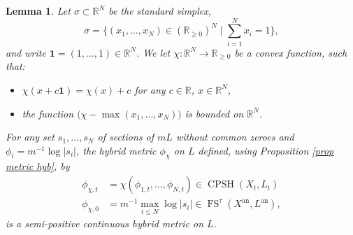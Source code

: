\documentclass[JEP,XML,SOM,Unicode,published]{cedram}
\let\ts\textstyle
\let\sep\mid
\newtheorem{lem}[equation]{Lemma}
\theoremstyle{definition}
\newcommand \R{\mathbb R}
\newcommand{\an}{\mathrm{an}}
\DeclareMathOperator{\CPSH}{CPSH}
\DeclareMathOperator{\FS}{FS}
\begin{document}
\begin{lem} \label{prop homo} Let $\sigma \subset \R^N$ be the standard simplex, \ie
\[
\sigma = \bigl\{ (x_1,\dots,x_N) \in (\R_{\ge 0})^N \sep\ts\sum_{i=1}^N x_i =1 \bigr\},
\]
and write $\mathbf{1} = (1,\dots,1) \in \R^N$. We let $\chi: \R^N \to \R_{\ge 0}$ be a convex function, such that:
\begin{itemize}
\item $\chi(x+c \mathbf{1}) = \chi(x)+c$ for any $c \in \R$, $x \in \R^N$,
\item the function $\bigl(\chi - \max (x_1,\dots,x_N) \bigr)$ is bounded on $\R^N$.
\end{itemize}
For any set $s_1,\dots,s_N$ of sections of $mL$ without common zeroes and $\phi_i =m^{-1} \log \lvert s_i \rvert$, the hybrid metric $\phi_{\chi}$ on $L$ defined, using Proposition \ref{prop metric hyb}, by
\begin{align*}
\phi_{\chi, t} &= \chi (\phi_{1,t},\dots, \phi_{N, t}) \in \CPSH(X_t, L_t)
\\
\tag*{and}
\phi_{\chi,0} &= m^{-1} \max_{i \le N} \log \lvert s_i \rvert \in \FS^{\tau}(X^{\an}, L^{\an}),
\end{align*}
is a semi-positive continuous hybrid metric on $L$.
\end{lem}
\end{document}
